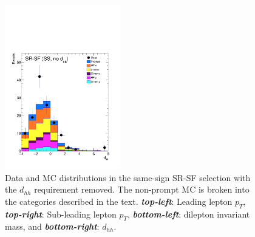 \begin{figure}[!htb]
\begin{center}
    \includegraphics[width=0.45\textwidth]{figures/search_hh/bkg_estimate/fake/fake_val_sr_sf_ss_NN_d_hh}
    \caption{
        Data and MC distributions in the same-sign SR-SF selection with the $d_{hh}$ requirement removed.
        The non-prompt MC is broken into the categories described in the text.
        \textbf{\textit{top-left}}: Leading lepton $p_{T}$, \textbf{\textit{top-right}}: Sub-leading lepton $p_{T}$,
        \textbf{\textit{bottom-left}}: dilepton invariant mass, and \textbf{\textit{bottom-right}}: $d_{hh}$.
    }
    \label{fig:fake_val_srsf}
    \end{center}
\end{figure}

